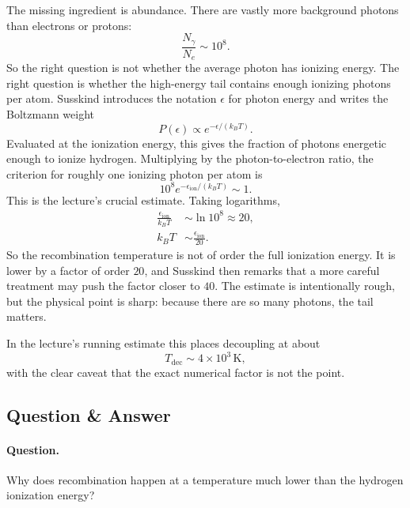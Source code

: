 The missing ingredient is abundance. There are vastly more background photons than electrons or protons:
\begin{equation}
\frac{N_\gamma}{N_e} \sim 10^8.
\end{equation}
So the right question is not whether the average photon has ionizing energy. The right question is whether the high-energy tail contains enough ionizing photons per atom. Susskind introduces the notation \(\epsilon\) for photon energy and writes the Boltzmann weight
\begin{equation}
P(\epsilon) \propto e^{-\epsilon/(k_B T)}.
\end{equation}
Evaluated at the ionization energy, this gives the fraction of photons energetic enough to ionize hydrogen. Multiplying by the photon-to-electron ratio, the criterion for roughly one ionizing photon per atom is
\begin{equation}
10^8 e^{-\epsilon_{\mathrm{ion}}/(k_B T)} \sim 1.
\end{equation}
This is the lecture's crucial estimate. Taking logarithms,
\begin{align}
\frac{\epsilon_{\mathrm{ion}}}{k_B T}
&\sim \ln 10^8
\approx 20,
\\[4pt]
k_B T
&\sim
\frac{\epsilon_{\mathrm{ion}}}{20}.
\end{align}
So the recombination temperature is not of order the full ionization energy. It is lower by a factor of order \(20\), and Susskind then remarks that a more careful treatment may push the factor closer to \(40\). The estimate is intentionally rough, but the physical point is sharp: because there are so many photons, the tail matters.

In the lecture's running estimate this places decoupling at about
\begin{equation}
T_{\mathrm{dec}} \sim 4\times 10^3\,\mathrm{K},
\end{equation}
with the clear caveat that the exact numerical factor is not the point.

\subsection{Question \& Answer}

\paragraph{Question.} Why does recombination happen at a temperature much lower than the hydrogen ionization energy?

